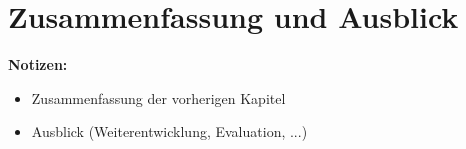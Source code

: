 \chapter{Zusammenfassung und Ausblick}\label{section:zusammenfassung-und-ausblick}

\begin{note}
    \textbf{Notizen:}
    \begin{itemize}
        \item Zusammenfassung der vorherigen Kapitel
        \item Ausblick (Weiterentwicklung, Evaluation, ...)
    \end{itemize}
\end{note}